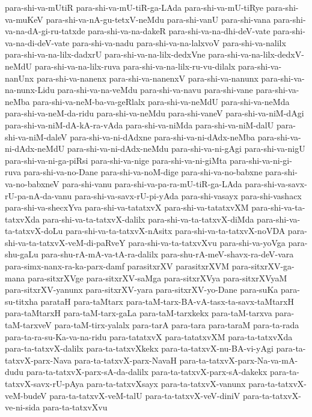 {para-shi-va-mUtiR
para-shi-va-mU-tiR-ga-LAda
para-shi-va-mU-tiRye
para-shi-va-muKeV
para-shi-va-nA-gu-tetxV-neMdu
para-shi-vanU
para-shi-vana
para-shi-va-na-dA-gi-ru-tatxde
para-shi-va-na-dakeR
para-shi-va-na-dhi-deV-vate
para-shi-va-na-di-deV-vate
para-shi-va-nadu
para-shi-va-na-lalxvoV
para-shi-va-nalilx
para-shi-va-na-lilx-dadxrU
para-shi-va-na-lilx-dedxVne
para-shi-va-na-lilx-dedxV-neMdU
para-shi-va-na-lilx-ruva
para-shi-va-na-lilx-ru-vu-dilalx
para-shi-va-nanUnx
para-shi-va-nanenx
para-shi-va-nanenxV
para-shi-va-nanunx
para-shi-va-na-nunx-Lidu
para-shi-va-na-veMdu
para-shi-va-navu
para-shi-vane
para-shi-va-neMba
para-shi-va-neM-ba-va-geRlalx
para-shi-va-neMdU
para-shi-va-neMda
para-shi-va-neM-da-ridu
para-shi-va-neMdu
para-shi-vaneV
para-shi-va-niM-dAgi
para-shi-va-niM-dA-kA-ra-vAda
para-shi-va-niMda
para-shi-va-niM-dalU
para-shi-va-niM-daleV
para-shi-va-ni-dAdxne
para-shi-va-ni-dAdx-neMba
para-shi-va-ni-dAdx-neMdU
para-shi-va-ni-dAdx-neMdu
para-shi-va-ni-gAgi
para-shi-va-nigU
para-shi-va-ni-ga-piRsi
para-shi-va-nige
para-shi-va-ni-giMta
para-shi-va-ni-gi-ruva
para-shi-va-no-Dane
para-shi-va-noM-dige
para-shi-va-no-babxne
para-shi-va-no-babxneV
para-shi-vanu
para-shi-va-pa-ra-mU-tiR-ga-LAda
para-shi-va-savx-rU-pa-nA-da-vanu
para-shi-va-savx-rU-pi-yAda
para-shi-vasayx
para-shi-vashacx
para-shi-va-shecxYva
para-shi-va-tatatxvX
para-shi-va-tatatxvXM
para-shi-va-ta-tatxvXda
para-shi-va-ta-tatxvX-dalilx
para-shi-va-ta-tatxvX-diMda
para-shi-va-ta-tatxvX-doLu
para-shi-va-ta-tatxvX-nAsitx
para-shi-va-ta-tatxvX-noVDA
para-shi-va-ta-tatxvX-veM-di-paRveY
para-shi-va-ta-tatxvXvu
para-shi-va-yoVga
para-shu-gaLu
para-shu-rA-mA-va-tA-ra-dalilx
para-shu-rA-meV-shavx-ra-deV-vara
para-simx-nanx-ra-ka-parx-damf
parasitxrXV
parasitxrXVM
para-sitxrXV-ga-mana
para-sitxrXVge
para-sitxrXV-saMga
para-sitxrXVya
para-sitxrXVyaM
para-sitxrXV-yanunx
para-sitxrXV-yara
para-sitxrXV-yo-Dane
para-suKa
para-su-titxha
parataH
para-taMtarx
para-taM-tarx-BA-vA-tasx-ta-savx-taMtarxH
para-taMtarxH
para-taM-tarx-gaLa
para-taM-tarxkekx
para-taM-tarxva
para-taM-tarxveV
para-taM-tirx-yalalx
para-tarA
para-tara
para-taraM
para-ta-rada
para-ta-ra-su-Ka-va-na-ridu
para-tatatxvX
para-tatatxvXM
para-ta-tatxvXda
para-ta-tatxvX-dalilx
para-ta-tatxvXkekx
para-ta-tatxvX-nu-BA-vi-yAgi
para-ta-tatxvX-parx-Nava
para-ta-tatxvX-parx-NavaH
para-ta-tatxvX-parx-Na-va-mA-dudu
para-ta-tatxvX-parx-sA-da-dalilx
para-ta-tatxvX-parx-sA-dakekx
para-ta-tatxvX-savx-rU-pAya
para-ta-tatxvXsayx
para-ta-tatxvX-vanunx
para-ta-tatxvX-veM-budeV
para-ta-tatxvX-veM-talU
para-ta-tatxvX-veV-diniV
para-ta-tatxvX-ve-ni-sida
para-ta-tatxvXvu
}
